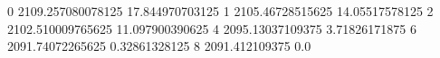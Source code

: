 0 2109.257080078125 17.844970703125
1 2105.46728515625 14.05517578125
2 2102.510009765625 11.097900390625
4 2095.13037109375 3.71826171875
6 2091.74072265625 0.32861328125
8 2091.412109375 0.0
